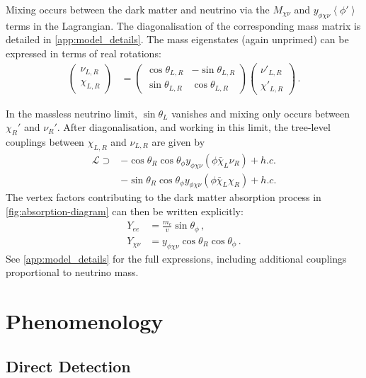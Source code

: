 \documentclass[aps, prd, reprint, nofootinbib, amsmath, amssymb, floatfix]{revtex4-2}
\begin{document}
Mixing occurs between the dark matter and neutrino via the $M_{\chi\nu}$ and $y_{\phi\chi\nu} \left<\phi'\right>$ terms in the Lagrangian. The diagonalisation of the corresponding mass matrix is detailed in \cref{app:model_details}. The mass eigenstates (again unprimed) can be expressed in terms of real rotations:
%
\begin{align}
    \begin{pmatrix}
        \nu_{L,R} \\ \chi_{L,R}
    \end{pmatrix}
    & =
    \begin{pmatrix}
        \cos\theta_{L,R} & -\sin\theta_{L,R} \\
        \sin\theta_{L,R} & \cos\theta_{L,R}
    \end{pmatrix}
    \begin{pmatrix}
        \nu'_{L,R} \\ \chi'_{L,R}
    \end{pmatrix} \,.
\end{align}

In the massless neutrino limit, $\sin\theta_L$ vanishes and mixing only occurs between $\chi_R'$ and $\nu_R'$. After diagonalisation, and working in this limit, the tree-level couplings between $\chi_{L,R}$ and $\nu_{L,R}$ are given by
%
\begin{align}
    \mathcal{L} \supset &- \cos\theta_R \cos\theta_\phi y_{\phi\chi\nu}(\phi \bar{\chi}_L\nu_R) + h.c.\nonumber\\
    &- \sin\theta_R \cos\theta_\phi y_{\phi\chi\nu}(\phi \bar{\chi}_L\chi_R) + h.c.
\end{align}
%
The vertex factors contributing to the dark matter absorption process in \cref{fig:absorption-diagram} can then be written explicitly:
%
\begin{align}
    Y_{ee} & = \frac{m_e}{v}\sin\theta_\phi \,,\\
    Y_{\chi\nu} & = y_{\phi\chi\nu}\cos\theta_R \cos\theta_\phi \,.
\end{align}
%
See \cref{app:model_details} for the full expressions, including additional couplings proportional to neutrino mass.



\section{\label{sec:phenomenology}Phenomenology}

\subsection{\label{sec:direct_detection}Direct Detection}
\end{document}
